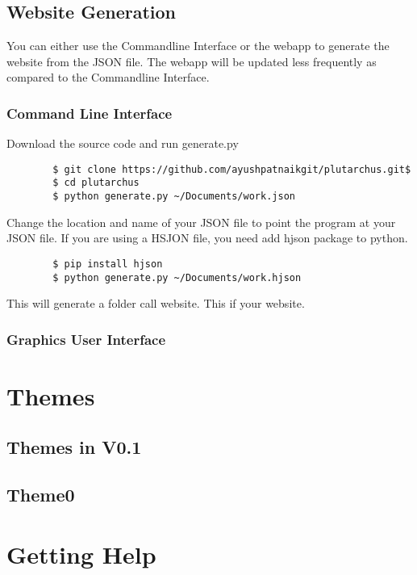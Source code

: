\documentclass[12pt]{article}
\begin{document}
    \subsection{Website Generation}
    
    You can either use the Commandline Interface or the webapp to 
    generate the website from the JSON file. The webapp will be updated less frequently as compared to the Commandline Interface.

    \subsubsection{Command Line Interface}

    Download the source code and run generate.py
    \begin{verbatim}
        $ git clone https://github.com/ayushpatnaikgit/plutarchus.git$
        $ cd plutarchus
        $ python generate.py ~/Documents/work.json 
    \end{verbatim}
    Change the location and name of your JSON file to point the program at your JSON file. 
    If you are using a HSJON file, you need add hjson package to python. 

    \begin{verbatim}
        $ pip install hjson
        $ python generate.py ~/Documents/work.hjson 
    \end{verbatim}

    This will generate a folder call website. This if your website. 
    

    \subsubsection{Graphics User Interface}
    \section{Themes}
    \subsection{Themes in V0.1}
    \subsection{Theme0}
    \section{Getting Help}
\end{document}

